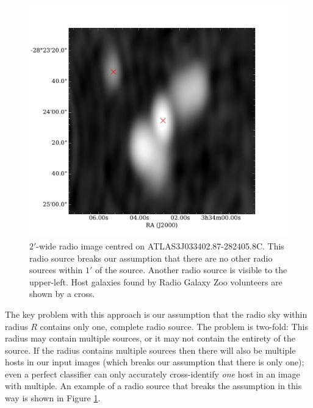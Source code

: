 \documentclass[fleqn,usenatbib,usedcolumn]{mnras}
\begin{document}
    \begin{figure}
      \centering
      \includegraphics[width=\linewidth]{images/ARG0003r2v_radio.pdf}
      \caption{$2'$-wide radio image centred on ATLAS3\textunderscore{}J033402.87-282405.8C.
        This radio source breaks our assumption that there are no other radio
        sources within $1'$ of the source. Another radio source is visible to
        the upper-left. Host galaxies found by Radio Galaxy Zoo volunteers are
        shown by a cross.}
      \label{fig:broken-isolation}
    \end{figure}

    The key problem with this approach is our assumption that the radio sky
    within radius $R$ contains only one, complete radio source. The problem is
    two-fold: This radius may contain multiple sources, or it may not contain
    the entirety of the source. If the radius contains multiple sources then
    there will also be multiple hosts in our input images (which breaks our
    assumption that there is only one); even a perfect classifier can only
    accurately cross-identify \emph{one} host in an image with multiple. An
    example of a radio source that breaks the assumption in this way is shown
    in Figure \ref{fig:broken-isolation}.
\end{document}
